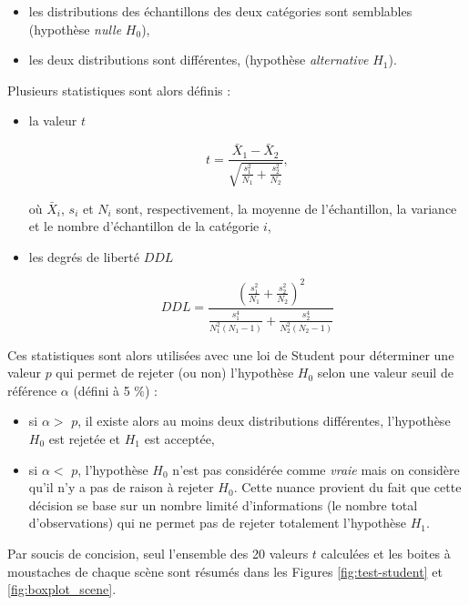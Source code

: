 \begin{itemize}
\item les distributions des échantillons des deux catégories sont semblables (hypothèse \textit{nulle} $H_0$),
\item les deux distributions sont différentes, (hypothèse \textit{alternative} $H_1$).\\
\end{itemize}

Plusieurs statistiques sont alors définis :
\begin{itemize}
\item la valeur $t$

\begin{equation}
t = \frac{\bar{X}_1-\bar{X}_2}{\sqrt{\frac{s_1^2}{N_1}+\frac{s_2^2}{N_2}}},
\end{equation}

où $\bar{X}_i$, $s_i$ et $N_i$ sont, respectivement, la moyenne de l'échantillon, la variance et le nombre d'échantillon de la catégorie $i$,
\item les degrés de liberté $DDL$

\begin{equation}
DDL = \frac{\left(\frac{s_1^2}{N_1}+\frac{s_2^2}{N_2} \right)^2}{\frac{s_1^4}{N_1^2(N_1-1)}+\frac{s_2^4}{N_2^2(N_2-1)}}
\end{equation}

\end{itemize}

Ces statistiques sont alors utilisées avec une loi de Student pour déterminer une valeur $p$ qui permet de rejeter (ou non) l'hypothèse $H_0$ selon une valeur seuil de référence $\alpha$ (défini à 5 $\%$) :

\begin{itemize}
\item si $\alpha >$ $p$, il existe alors au moins deux distributions différentes, l'hypothèse $H_0$ est rejetée et $H_1$ est acceptée,
\item si $\alpha <$ $p$, l'hypothèse $H_0$ n'est pas considérée comme \textit{vraie} mais on considère qu'il n'y a pas de raison à rejeter $H_0$. Cette nuance provient du fait que cette décision se base sur un nombre limité d'informations (le nombre total d'observations) qui ne permet pas de rejeter totalement l'hypothèse $H_1$.\\
\end{itemize}

Par soucis de concision, seul l'ensemble des 20 valeurs $t$ calculées et les boites à moustaches de chaque scène sont résumés dans les Figures  \ref{fig:test-student} et \ref{fig:boxplot_scene}.

